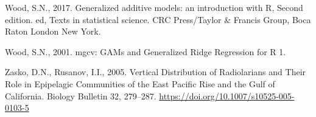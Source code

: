 \documentclass[
]{article}
\newlength{\cslhangindent}
\newlength{\cslentryspacingunit} %
\newenvironment{CSLReferences}[2] %
 {%
  \setlength{\parindent}{0pt}
  \ifodd #1
  \let\oldpar\par
  \def\par{\hangindent=\cslhangindent\oldpar}
  \fi
  \setlength{\parskip}{#2\cslentryspacingunit}
 }%
 {}
\begin{document}
\begin{CSLReferences}{1}{0}
\leavevmode{}%
Wood, S.N., 2017. Generalized additive models: an introduction with R,
Second edition. ed, Texts in statistical science. CRC Press/Taylor \&
Francis Group, Boca Raton London New York.

\leavevmode{}%
Wood, S.N., 2001. mgcv: GAMs and Generalized Ridge Regression for R 1.

\leavevmode{}%
Zasko, D.N., Rusanov, I.I., 2005. Vertical Distribution of Radiolarians
and Their Role in Epipelagic Communities of the East Pacific Rise and
the Gulf of California. Biology Bulletin 32, 279--287.
\url{https://doi.org/10.1007/s10525-005-0103-5}

\end{CSLReferences}

\newpage
\end{document}

